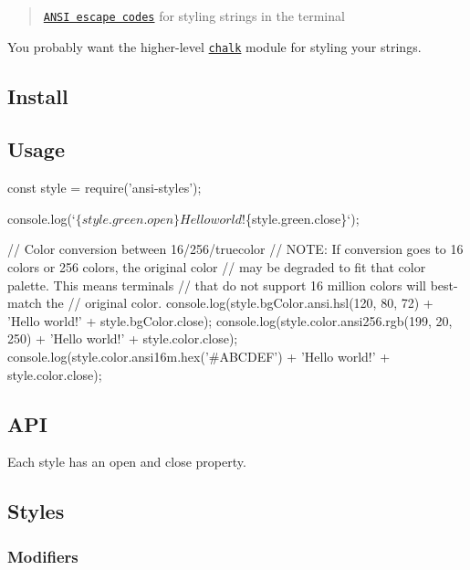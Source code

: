 \begin{quote}
\href{http://en.wikipedia.org/wiki/ANSI_escape_code#Colors_and_Styles}{\tt A\+N\+SI escape codes} for styling strings in the terminal \end{quote}


You probably want the higher-\/level \href{https://github.com/chalk/chalk}{\tt chalk} module for styling your strings.



\subsection*{Install}




\subsection*{Usage}


\begin{DoxyCode}
const style = require('ansi-styles');

console.log(`$\{style.green.open\}Hello world!$\{style.green.close\}`);


// Color conversion between 16/256/truecolor
// NOTE: If conversion goes to 16 colors or 256 colors, the original color
//       may be degraded to fit that color palette. This means terminals
//       that do not support 16 million colors will best-match the
//       original color.
console.log(style.bgColor.ansi.hsl(120, 80, 72) + 'Hello world!' + style.bgColor.close);
console.log(style.color.ansi256.rgb(199, 20, 250) + 'Hello world!' + style.color.close);
console.log(style.color.ansi16m.hex('#ABCDEF') + 'Hello world!' + style.color.close);
\end{DoxyCode}


\subsection*{A\+PI}

Each style has an {\ttfamily open} and {\ttfamily close} property.

\subsection*{Styles}

\subsubsection*{Modifiers}


